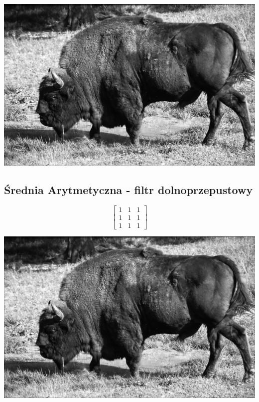 \documentclass{article}
\begin{document}
	\begin{center}
		\includegraphics[width=\linewidth]{../../lab03/bison_gauss.png}
		\label{fig:bison_gauss}
	\end{center}
	
	
	\subsection{Średnia Arytmetyczna - filtr dolnoprzepustowy}
	\begin{equation}
	\left[
	\begin{matrix}
	1 & 1 & 1 \\
	1 & 1 & 1 \\
	1 & 1 & 1 
	\end{matrix}
	\right]
	\end{equation}
	
	\begin{center}
		\includegraphics[width=\linewidth]{../../lab03/bison_avg.png}
		\label{fig:bison_avg}
	\end{center}
\end{document}
